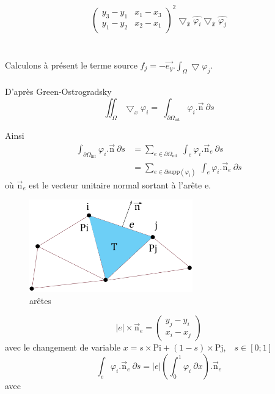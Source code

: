 \documentclass[a4paper,12pt,titlepage]{report}
\begin{document}
\begin{onehalfspace}
\[{\begin{aligned}
	\begin{pmatrix}
   		y_{3}-y_{1} &  	x_{1}-x_{3}\\
   		y_{1}-y_{2} &  x_{2}-x_{1}
	\end{pmatrix}
	^{2}
	\bigtriangledown_{\hat{x}} \hat{\varphi_{i}}
	\bigtriangledown_{\hat{x}} \hat{\varphi_{j}}
\end{aligned}}
\]
\\
\\
Calculons à présent le terme source $f_{j} =  -\vec{e_{y}}.\int_{\Omega} \bigtriangledown\varphi_{j}$.
\\
\\
D'après Green-Ostrogradsky
\[
	\iint_{\Omega}\bigtriangledown_{x}{\varphi_{i}} =\ 
	\int_{\partial\Omega_{\text{int}}}\varphi_{i}.\vec{\text{n}} \ \partial s
\]

Ainsi	
\[
	\begin{aligned}
		\int_{\partial\Omega_{\text{int}}}\varphi_{i}.\vec{\text{n}}\ \partial s &= 
		\sum_{e \in \partial\Omega_{\text{int}}}\ \int_{e}\varphi_{i}.\vec{\text{n}}_{e}\ \partial s \\ &=  
		\sum_{e \in \partial\text{supp}(\varphi_{i})}\ \int_{e}\varphi_{i}.\vec{\text{n}}_{e}\ \partial s
	\end{aligned}
\]
où $\vec{\text{n}}_{e}$ est le vecteur unitaire normal sortant à l'arête e. \\
\begin{figure}[h]
\begin{center}
\includegraphics[height = 4cm, keepaspectratio]{graphes/bord.png}
\caption{arêtes}
\label{figure 1}
\end{center}
\end{figure}
\[
	|e|\times \vec{\text{n}}_{e}
	=
	\begin{pmatrix}
		y_{j}-y_{i} \\
		x_{i}-x_{j}
	\end{pmatrix}
\]
avec le changement de variable $x = s\times \text{Pi} + (1-s)\times \text{Pj}$,\ \ $s \in [0;1]$
\[
	\int_{e}\varphi_{i}.\vec{\text{n}}_{e}\ \partial s = |e|(\int_{0}^{1}\varphi_{i}\ \partial x ).\vec{\text{n}}_{e}
\]
avec 

\end{onehalfspace}
\end{document}
